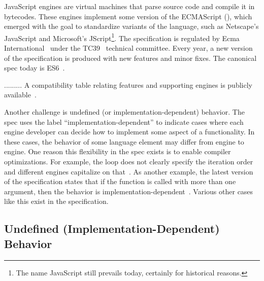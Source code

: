 \documentclass[10pt,conference,anonymous]{IEEEtran}
\begin{document}
JavaScript engines are virtual machines that parse source code and
compile it in bytecodes. These engines implement some version of the
ECMAScript (\es{}), which emerged with the goal to standardize
variants of the language, such as Netscape's JavaScript and
Microsoft's JScript\footnote{The name JavaScript still prevails today,
  certainly for historical reasons.}. The \es{} specification is
regulated by Ecma International~\cite{es6-website} under the
TC39~\cite{tc39-github} technical committee.  Every year, a new
version of the \es{} specification is produced with new features and
minor fixes. The canonical spec today is
ES6~\cite{ecmas262-spec-repo,ecmas262-spec}.


.........
A compatibility table relating features and supporting engines is
publicly available~\cite{kangax}.

Another
challenge is undefined (or implementation-dependent) behavior. The
\es{} spec uses the label ``implementation-dependent'' to indicate
cases where each engine developer can decide how to implement some
aspect of a functionality. In these cases, the behavior of some
language element may differ from engine to engine. One reason this
flexibility in the spec exists is to enable compiler
optimizations. For example, the  loop does not clearly
specify the iteration
order~\cite{so-forin-undefined,javascript-in-chrome} and different
engines capitalize on that~\cite{for-in-undefined}.  As another
example, the latest version of the \es{} specification states that if
the  function is called with more than
one argument, then the behavior is
implementation-dependent~\cite{es6-toPrecision}. Various other cases
like this exist in the specification.


\subsection{Undefined (Implementation-Dependent) Behavior}





\end{document}
